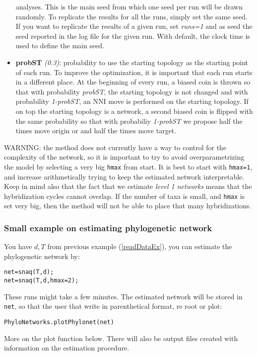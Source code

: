 \documentclass[12pt]{article}
\begin{document}
\begin{itemize}
  analyses. This is the main seed from which one seed per run will be
  drawn randomly. To replicate the results for all the runs, simply
  set the same seed. If you want to replicate the results of a given
  run, set \textit{runs=1} and as seed the seed reported in the log
  file for the given run. With default, the clock time is used to
  define the main seed.
\item \textbf{probST} \textit{(0.3)}: probability to use the starting
  topology as the starting point of each run. To improve the
  optimization, it is important that each run starts in a different
  place. At the beginning of every run, a biased coin is thrown so
  that with probability \textit{probST}, the starting topology is not
  changed and with probability \textit{1-probST}, an NNI move is
  performed on the starting topology. If on top the starting topology
  is a network, a second biased coin is flipped with the same
  probability so that with probabiliy \textit{1-probST} we propose
  half the times move origin or and half the times move target.
\end{itemize}

WARNING: the method does not currently have a way to control for the
complexity of the network, so it is important to try to avoid
overparametrizing the model by selecting a very big \texttt{hmax} from
start. It is best to start with \texttt{hmax=1}, and increase
arithmetically trying to keep the estimated network
interpretable. Keep in mind also that the fact that we estimate
\textit{level 1 networks} means that the hybridization cycles cannot
overlap. If the number of taxa is small, and \texttt{hmax} is set very
big, then the method will not be able to place that many
hybridizations.

\subsubsection{Small example on estimating phylogenetic network}
You have $d,T$ from previous example (\ref{readDataEx}), you can
estimate the phylogenetic network by:
\begin{lstlisting}
net=snaq(T,d);
net=snaq(T,d,hmax=2);
\end{lstlisting}
These runs might take a few minutes. The estimated network will be
stored in \texttt{net}, so that the user that write in parenthetical
format, re root or plot:
\begin{lstlisting}
PhyloNetworks.plotPhylonet(net)
\end{lstlisting}
More on the plot function below. There will also be output files
created with information on the estimation procedure.
\end{document}

